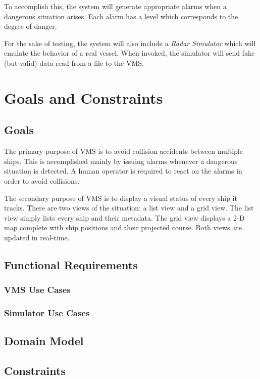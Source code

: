 \documentclass{article}
\begin{document}
To accomplish this, the system will generate appropriate alarms when a dangerous situation arises. Each alarm has a level which corresponds to the degree of danger.

For the sake of testing, the system will also include a \emph{Radar Simulator} which will emulate the behavior of a real vessel. When invoked, the simulator will send fake (but valid) data read from a file to the VMS.

\section{Goals and Constraints}

\subsection{Goals}
The primary purpose of VMS is to avoid collision accidents between multiple ships. This is accomplished mainly by issuing alarms whenever a dangerous situation is detected. A human operator is required to react on the alarms in order to avoid collisions.

The secondary purpose of VMS is to display a visual status of every ship it tracks. There are two views of the situation: a list view and a grid view. The list view simply lists every ship and their metadata. The grid view displays a 2-D map complete with ship positions and their projected course. Both views are updated in real-time.

\subsection{Functional Requirements}

\subsubsection{VMS Use Cases}

\subsubsection{Simulator Use Cases}

\subsection{Domain Model}

\subsection{Constraints}
\end{document}
